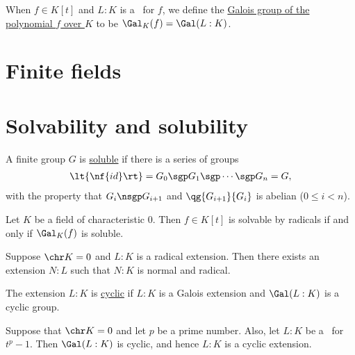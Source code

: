 \documentclass[a4paper]{article}
\begin{document}
\begin{tdefinition}
  When \( f\in K[t] \) and \( L:K \) is a \sfe~for \( f \), we define the \ul{Galois group of the polynomial \( f \) over \( K \)} to be \( \Gal_K(f) = \Gal(L:K) \).
\end{tdefinition}


\section{Finite fields}

\section{Solvability and solubility}
\begin{tdefinition}
  A finite group \( G \) is \ul{soluble} if there is a series of groups \begin{align*}
    \lt\{ \nf{id} \rt\} = G_0 \sgp G_1 \sgp \cdots\sgp G_n = G,
  \end{align*}
  with the property that \( G_i \nsgp G_{i+1} \) and \( \qg{G_{i+1}}{G_i} \) is abelian (\( 0\leq i < n \)).
\end{tdefinition}

\begin{ttheorem}
  Let \( K \) be a field of characteristic 0.
  Then \( f\in K[t] \) is solvable by radicals if and only if \( \Gal_K(f) \) is soluble.
\end{ttheorem}

\begin{tlemma}
  Suppose \( \chr K = 0 \) and \( L:K \) is a radical extension.
  Then there exists an extension \( N:L \) such that \( N:K \) is normal and radical.
\end{tlemma}

\begin{tdefinition}
  The extension \( L:K \) is \ul{cyclic} if \( L:K \) is a Galois extension and \( \Gal(L:K) \) is a cyclic group.
\end{tdefinition}

\begin{tlemma}
  Suppose that \( \chr K = 0 \) and let \( p \) be a prime number.
  Also, let \( L:K \) be a \sfe~for \( t^p-1 \).
  Then \( \Gal(L:K) \) is cyclic, and hence \( L:K \) is a cyclic extension.
\end{tlemma}
\end{document}
